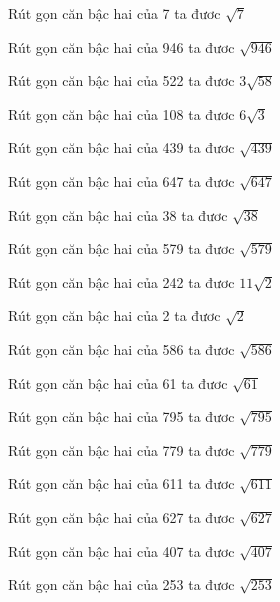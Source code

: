 \documentclass[12pt,a4paper]{article}
\begin{document}
\begin{ex}
Rút gọn căn bậc hai của 7 ta đươc $\sqrt{7}$
\end{ex}
\begin{ex}
Rút gọn căn bậc hai của 946 ta đươc $\sqrt{946}$
\end{ex}
\begin{ex}
Rút gọn căn bậc hai của 522 ta đươc $3\sqrt{58}$
\end{ex}
\begin{ex}
Rút gọn căn bậc hai của 108 ta đươc $6\sqrt{3}$
\end{ex}
\begin{ex}
Rút gọn căn bậc hai của 439 ta đươc $\sqrt{439}$
\end{ex}
\begin{ex}
Rút gọn căn bậc hai của 647 ta đươc $\sqrt{647}$
\end{ex}
\begin{ex}
Rút gọn căn bậc hai của 38 ta đươc $\sqrt{38}$
\end{ex}
\begin{ex}
Rút gọn căn bậc hai của 579 ta đươc $\sqrt{579}$
\end{ex}
\begin{ex}
Rút gọn căn bậc hai của 242 ta đươc $11\sqrt{2}$
\end{ex}
\begin{ex}
Rút gọn căn bậc hai của 2 ta đươc $\sqrt{2}$
\end{ex}
\begin{ex}
Rút gọn căn bậc hai của 586 ta đươc $\sqrt{586}$
\end{ex}
\begin{ex}
Rút gọn căn bậc hai của 61 ta đươc $\sqrt{61}$
\end{ex}
\begin{ex}
Rút gọn căn bậc hai của 795 ta đươc $\sqrt{795}$
\end{ex}
\begin{ex}
Rút gọn căn bậc hai của 779 ta đươc $\sqrt{779}$
\end{ex}
\begin{ex}
Rút gọn căn bậc hai của 611 ta đươc $\sqrt{611}$
\end{ex}
\begin{ex}
Rút gọn căn bậc hai của 627 ta đươc $\sqrt{627}$
\end{ex}
\begin{ex}
Rút gọn căn bậc hai của 407 ta đươc $\sqrt{407}$
\end{ex}
\begin{ex}
Rút gọn căn bậc hai của 253 ta đươc $\sqrt{253}$
\end{ex}
\end{document}
